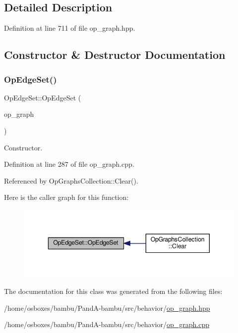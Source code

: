 \subsection{Detailed Description}


Definition at line 711 of file op\+\_\+graph.\+hpp.



\subsection{Constructor \& Destructor Documentation}
\mbox{\label{classOpEdgeSet_a53ee231ba7edd0e15a75390e41cba37b}} 
\subsubsection{\texorpdfstring{Op\+Edge\+Set()}{OpEdgeSet()}}
{\footnotesize\ttfamily Op\+Edge\+Set\+::\+Op\+Edge\+Set (\begin{DoxyParamCaption}\item[{const \hyperlink{op__graph_8hpp_a9a0b240622c47584bee6951a6f5de746}{Op\+Graph\+Const\+Ref}}]{op\+\_\+graph }\end{DoxyParamCaption})\hspace{0.3cm}{\ttfamily [explicit]}}



Constructor. 



Definition at line 287 of file op\+\_\+graph.\+cpp.



Referenced by Op\+Graphs\+Collection\+::\+Clear().

Here is the caller graph for this function\+:
\nopagebreak
\begin{figure}[H]
\begin{center}
\leavevmode
\includegraphics[width=343pt]{d4/d64/classOpEdgeSet_a53ee231ba7edd0e15a75390e41cba37b_icgraph}
\end{center}
\end{figure}


The documentation for this class was generated from the following files\+:\begin{DoxyCompactItemize}
\item 
/home/osboxes/bambu/\+Pand\+A-\/bambu/src/behavior/\hyperlink{op__graph_8hpp}{op\+\_\+graph.\+hpp}\item 
/home/osboxes/bambu/\+Pand\+A-\/bambu/src/behavior/\hyperlink{op__graph_8cpp}{op\+\_\+graph.\+cpp}\end{DoxyCompactItemize}
